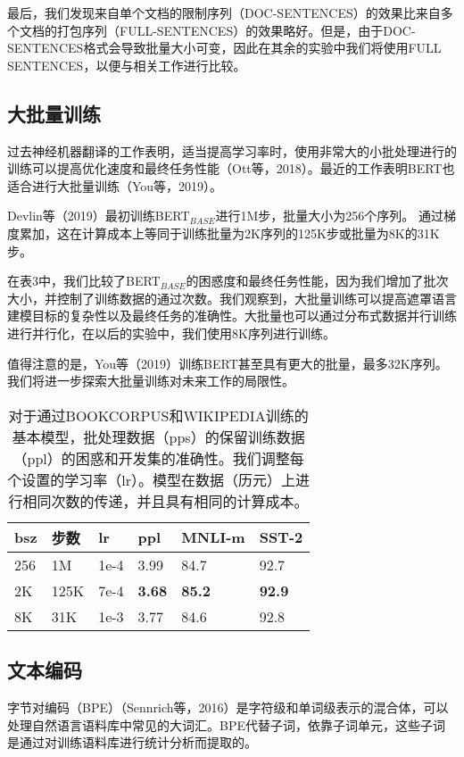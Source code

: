 \documentclass[lang=cn,11pt,a4paper,twocolumn]{elegantpaper}
\begin{document}
最后，我们发现来自单个文档的限制序列（DOC-SENTENCES）的效果比来自多个文档的打包序列（FULL-SENTENCES）的效果略好。但是，由于DOC-SENTENCES格式会导致批量大小可变，因此在其余的实验中我们将使用FULL SENTENCES，以便与相关工作进行比较。

\subsection{大批量训练}
过去神经机器翻译的工作表明，适当提高学习率时，使用非常大的小批处理进行的训练可以提高优化速度和最终任务性能（Ott等，2018）。最近的工作表明BERT也适合进行大批量训练（You等，2019）。

Devlin等（2019）最初训练BERT$_{BASE}$进行1M步，批量大小为256个序列。
通过梯度累加，这在计算成本上等同于训练批量为2K序列的125K步或批量为8K的31K步。

在表3中，我们比较了BERT$_{BASE}$的困惑度和最终任务性能，因为我们增加了批次大小，并控制了训练数据的通过次数。我们观察到，大批量训练可以提高遮罩语言建模目标的复杂性以及最终任务的准确性。大批量也可以通过分布式数据并行训练进行并行化，在以后的实验中，我们使用8K序列进行训练。

值得注意的是，You等（2019）训练BERT甚至具有更大的批量，最多32K序列。我们将进一步探索大批量训练对未来工作的局限性。

\begin{table}[]
  \centering
  \begin{tabular}{llllll}
  \hline
  \textbf{bsz} & 步数   & \textbf{lr} & \textbf{ppl}  & \textbf{MNLI-m} & \textbf{SST-2} \\ \hline
  256          & 1M   & 1e-4        & 3.99          & 84.7            & 92.7           \\
  2K           & 125K & 7e-4        & \textbf{3.68} & \textbf{85.2}   & \textbf{92.9}  \\
  8K           & 31K  & 1e-3        & 3.77          & 84.6            & 92.8           \\ \hline
  \end{tabular}
  \caption{对于通过BOOKCORPUS和WIKIPEDIA训练的基本模型，批处理数据（pps）的保留训练数据（ppl）的困惑和开发集的准确性。我们调整每个设置的学习率（lr）。模型在数据（历元）上进行相同次数的传递，并且具有相同的计算成本。}
  \end{table}

\subsection{文本编码}
字节对编码（BPE）（Sennrich等，2016）是字符级和单词级表示的混合体，可以处理自然语言语料库中常见的大词汇。BPE代替子词，依靠子词单元，这些子词是通过对训练语料库进行统计分析而提取的。
\end{document}
